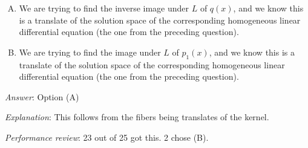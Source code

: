 \documentclass[10pt]{amsart}
\begin{document}
\begin{enumerate}
  \begin{enumerate}[(A)]
  \item We are trying to find the inverse image under $L$ of $q(x)$,
    and we know this is a translate of the solution space of the
    corresponding homogeneous linear differential equation (the one
    from the preceding question).
  \item We are trying to find the image under $L$ of $p_1(x)$,
    and we know this is a translate of the solution space of the
    corresponding homogeneous linear differential equation (the one
    from the preceding question).
  \end{enumerate}

  {\em Answer}: Option (A)

  {\em Explanation}: This follows from the fibers being translates of
  the kernel.

  {\em Performance review}: 23 out of 25 got this. 2 chose (B).
\end{enumerate}
\end{document}
